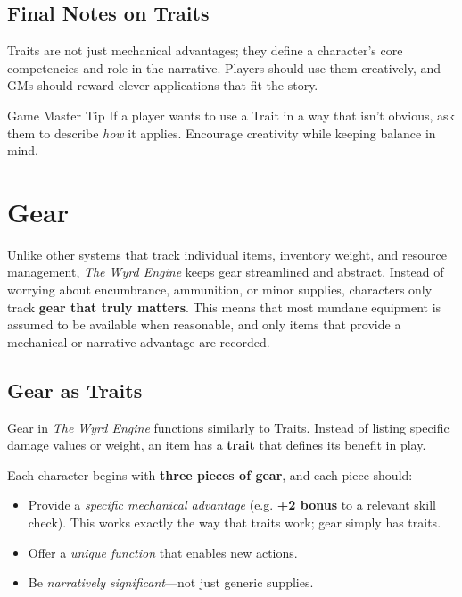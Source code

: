 \subsection{Final Notes on Traits}

Traits are not just mechanical advantages; they define a character’s core competencies and role in the narrative. Players should use them creatively, and GMs should reward clever applications that fit the story.

\begin{DndComment}{Game Master Tip}
 If a player wants to use a Trait in a way that isn’t obvious, ask them to describe \emph{how} it applies. Encourage creativity while keeping balance in mind.
\end{DndComment}

\section{Gear}

Unlike other systems that track individual items, inventory weight, and resource management, \emph{The Wyrd Engine} keeps gear streamlined and abstract. Instead of worrying about encumbrance, ammunition, or minor supplies, characters only track \textbf{gear that truly matters}. This means that most mundane equipment is assumed to be available when reasonable, and only items that provide a mechanical or narrative advantage are recorded.

\subsection{Gear as Traits}
Gear in \emph{The Wyrd Engine} functions similarly to Traits. Instead of listing specific damage values or weight, an item has a \textbf{trait} that defines its benefit in play. 

Each character begins with \textbf{three pieces of gear}, and each piece should:
\begin{itemize}
    \item Provide a \emph{specific mechanical advantage} (e.g. \textbf{+2 bonus} to a relevant skill check). This works exactly the way that traits work; gear simply has traits.
    \item Offer a \emph{unique function} that enables new actions.
    \item Be \emph{narratively significant}—not just generic supplies.
\end{itemize}

